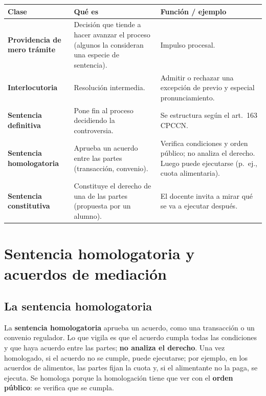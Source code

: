 \documentclass[12pt,oneside]{book}
\begin{document}
\begin{table}[H]
\centering
\small
\begin{tabularx}{\textwidth}{>{\raggedright\arraybackslash}p{}>{\raggedright\arraybackslash}X>{\raggedright\arraybackslash}X}
\toprule
\textbf{Clase} & \textbf{Qu\'e es} & \textbf{Funci\'on / ejemplo} \\
\midrule
\textbf{Providencia de mero tr\'amite} & Decisi\'on que tiende a hacer avanzar el proceso (algunos la consideran una especie de sentencia). & Impulso procesal. \\
\addlinespace
\textbf{Interlocutoria} & Resoluci\'on intermedia. & Admitir o rechazar una excepci\'on de previo y especial pronunciamiento. \\
\addlinespace
\textbf{Sentencia definitiva} & Pone fin al proceso decidiendo la controversia. & Se estructura seg\'un el art.~163 CPCCN. \\
\addlinespace
\textbf{Sentencia homologatoria} & Aprueba un acuerdo entre las partes (transacci\'on, convenio). & Verifica condiciones y orden p\'ublico; no analiza el derecho. Luego puede ejecutarse (p.~ej., cuota alimentaria). \\
\addlinespace
\textbf{Sentencia constitutiva} & Constituye el derecho de una de las partes (propuesta por un alumno). & El docente invita a mirar qu\'e se va a ejecutar despu\'es. \\
\bottomrule
\end{tabularx}
\end{table}

\section{Sentencia homologatoria y acuerdos de mediaci\'on}

\subsection{La sentencia homologatoria}

La \textbf{sentencia homologatoria} aprueba un acuerdo, como una transacci\'on o un convenio regulador. Lo que vigila es que el acuerdo cumpla todas las condiciones y que haya acuerdo entre las partes; \textbf{no analiza el derecho}. Una vez homologado, si el acuerdo no se cumple, puede ejecutarse; por ejemplo, en los acuerdos de alimentos, las partes fijan la cuota y, si el alimentante no la paga, se ejecuta. Se homologa porque la homologaci\'on tiene que ver con el \textbf{orden p\'ublico}: se verifica que se cumpla.
\end{document}
